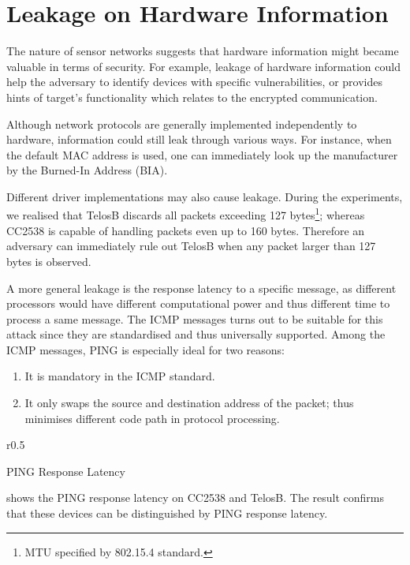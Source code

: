 \section{Leakage on Hardware Information}


The nature of sensor networks suggests that hardware information might became valuable in terms of security. For example, leakage of hardware information could help the adversary to identify devices with specific vulnerabilities, or provides hints of target's functionality which relates to the encrypted communication.

Although network protocols are generally implemented independently to hardware, information could still leak through various ways. For instance, when the default MAC address is used, one can immediately look up the manufacturer by the Burned-In Address (BIA)\cite{BIA}.

Different driver implementations may also cause leakage. During the experiments, we realised that TelosB\cite{TelosB} discards all packets exceeding 127 bytes\footnote{MTU specified by 802.15.4 standard.}; whereas CC2538 is capable of handling packets even up to 160 bytes. Therefore an adversary can immediately rule out TelosB when any packet larger than 127 bytes is observed.

A more general leakage is the response latency to a specific message, as different processors would have different computational power and thus different time to process a same message. The ICMP messages turns out to be suitable for this attack since they are standardised and thus universally supported. Among the ICMP messages, PING is especially ideal for two reasons: 
\begin{enumerate}
	\item It is mandatory in the ICMP standard.
	\item It only swaps the source and destination address of the packet; thus minimises different code path in protocol processing.
\end{enumerate}

\begin{table}{r}{0.5\textwidth}
	\center
	
	\caption{PING Response Latency\label{PingResponse}}
\end{table}

 shows the PING response latency on CC2538 and TelosB. The result confirms that these devices can be distinguished by PING response latency.


